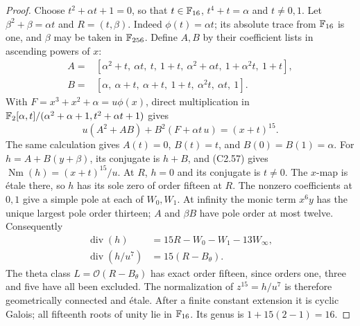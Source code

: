 \begin{proof}
Choose $t^2+\alpha t+1=0$, so that
$t\in\mathbb F_{16}$, $t^4+t=\alpha$ and $t\ne0,1$.
Let $\beta^2+\beta=\alpha t$ and $R=(t,\beta)$.
Indeed $\phi(t)=\alpha t$; its absolute trace
from $\mathbb F_{16}$ is one, and $\beta$ may be taken
in $\mathbb F_{256}$. Define $A,B$ by their coefficient
lists in ascending powers of $x$:
\[
\begin{aligned}
 A={}&[\alpha^2+t,\ \alpha t,\ t,\ 1+t,
           \ \alpha^2+\alpha t,\ 1+\alpha^2t,\ 1+t],\\
 B={}&[\alpha,\ \alpha+t,\ \alpha+t,\ 1+t,
                  \ \alpha^2t,\ \alpha t,\ 1].
\end{aligned}                                                   \tag{C2.56}
\]
With $F=x^3+x^2+\alpha=u\phi(x)$, direct multiplication
in $\mathbb F_2[\alpha,t]/(\alpha^2+\alpha+1,t^2+\alpha t+1)$
gives
\[
          u(A^2+AB)+B^2(F+\alpha t\,u)=(x+t)^{15}.              \tag{C2.57}
\]
The same calculation gives
$A(t)=0$, $B(t)=t$, and $B(0)=B(1)=\alpha$.
For $h=A+B(y+\beta)$, its conjugate is $h+B$,
and (C2.57) gives
$\operatorname{Nm}(h)=(x+t)^{15}/u$.
At $R$, $h=0$ and its conjugate is $t\ne0$.
The $x$-map is \'etale there, so $h$ has its
sole zero of order fifteen at $R$.
The nonzero coefficients at $0,1$ give a simple
pole at each of $W_0,W_1$.
At infinity the monic term $x^6y$ has the unique
largest pole order thirteen; $A$ and $\beta B$
have pole order at most twelve. Consequently
\[
 \begin{aligned}
 \operatorname{div}(h)&=15R-W_0-W_1-13W_\infty,\\
 \operatorname{div}(h/u^7)&=15(R-B_\theta).
 \end{aligned}                                                   \tag{C2.58}
\]
The theta class $L=\mathcal O(R-B_\theta)$ has
exact order fifteen, since orders one, three
and five have all been excluded.
The normalization of $z^{15}=h/u^7$ is therefore
geometrically connected and \'etale. After a finite
constant extension it is cyclic Galois; all fifteenth
roots of unity lie in $\mathbb F_{16}$.
Its genus is $1+15(2-1)=16$.


\end{proof}
